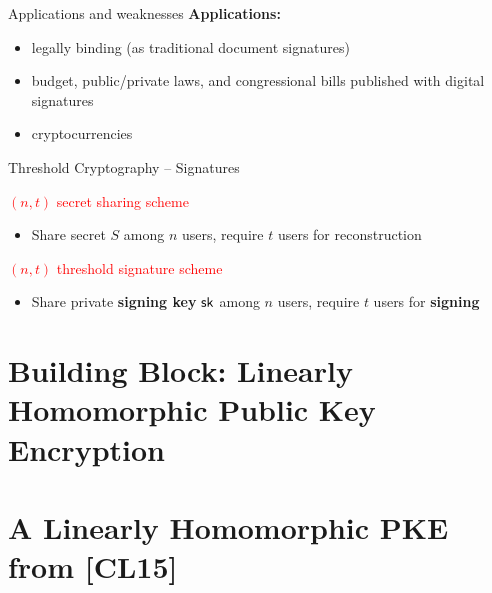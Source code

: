 \documentclass[10pt]{beamer}
\begin{document}
\begin{frame}{Applications and weaknesses}
\textbf{Applications:}
\begin{itemize}
\item legally binding (as traditional document signatures)
\item budget, public/private laws, and congressional bills published with digital signatures
\item cryptocurrencies
\end{itemize}
\end{frame}

\begin{frame}{Threshold Cryptography -- Signatures}

\textcolor{red}{$(n,t)$ secret sharing scheme} 
\begin{itemize}
\item Share secret $S$ among $n$ users, require $t$ users for reconstruction
\end{itemize}
\textcolor{red}{$(n,t)$ threshold signature scheme} 
\begin{itemize}
\item Share private \textbf{signing key} $\mathsf{sk}$ among $n$ users, require $t$ users for \textbf{signing}
\end{itemize}
\end{frame}


\section{Building Block: Linearly Homomorphic Public Key Encryption}



\section{A Linearly Homomorphic PKE from [CL15]}
\end{document}
